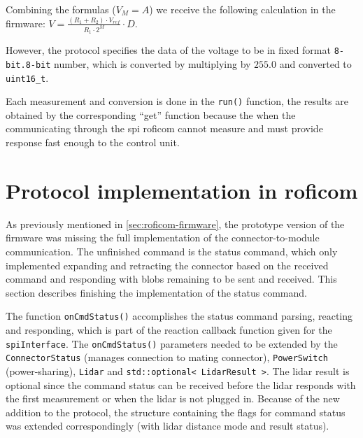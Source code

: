 \documentclass[
  digital,     %
  oneside,     %
  nosansbold,  %
  nocolorbold, %
  nolof,         %
  nolot,         %
]{fithesis4}
\newcommand{\TODO}[1]{#1} %
\newcommand{\TODOLIST}[1]{}
\begin{document}
Combining the formulas ($V_M = A$) we receive the following calculation in the firmware: $V =
\frac{(R_1 + R_2) \cdot V_{ref}}{R_1 \cdot 2^{M}} \cdot D$.

However, the protocol specifies the data of the voltage to be in fixed format \verb|8-bit.8-bit|
number, which is converted by multiplying by $255.0$ and converted to \lstinline|uint16_t|.

Each measurement and conversion is done in the \lstinline|run()| function, the results are obtained
by the corresponding ``get'' function because the when the communicating through the \acrshort{spi}
\acrshort{roficom} cannot measure and must provide response fast enough to the control unit.

\section[ Protocol Implementation in RoFICoM ]{ Protocol implementation in \acrshort{roficom} }
\TODOLIST{
\begin{itemize}
    \item Added power information - connection of INT and EXT, current and voltage of INT and EXT.
    \item Connection to mating side.
    \item Lidar status and distance and setting distance mode.
\end{itemize}
}

As previously mentioned in \autoref{sec:roficom-firmware}, the prototype version of the firmware was
missing the full implementation of the connector-to-module communication. The unfinished command is
the status command, which only implemented expanding and retracting the connector based on the
received command and responding with blobs remaining to be sent and received. This section describes
finishing the implementation of the status command.

The function \lstinline|onCmdStatus()| accomplishes the status command parsing, reacting and
responding, which is part of the reaction callback function given for the \lstinline|spiInterface|.
The \lstinline|onCmdStatus()| parameters needed to be extended by the \lstinline|ConnectorStatus|
(manages connection to mating connector), \lstinline|PowerSwitch| (power-sharing), \lstinline|Lidar|
and \lstinline|std::optional< LidarResult >|. The \acrshort{lidar} result is optional since the
command status can be received before the \acrshort{lidar} responds with the first measurement or
when the \acrshort{lidar} is not plugged in. Because of the new addition to the protocol, the
structure containing the flags for command status was extended correspondingly (with
\acrshort{lidar} distance mode and result status).
\end{document}
